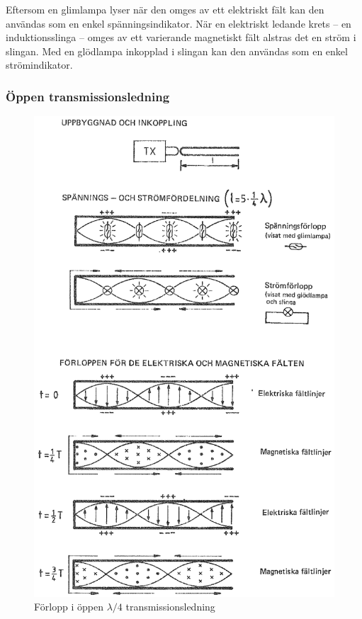 Eftersom en glimlampa lyser när den omges av ett elektriskt fält kan
den användas som en enkel spänningsindikator.  När en elektriskt
ledande krets -- en induktionsslinga -- omges av ett varierande
magnetiskt fält alstras det en ström i slingan.  Med en glödlampa
inkopplad i slingan kan den användas som en enkel strömindikator.

\subsubsection{Öppen transmissionsledning}

\begin{figure}
  \includegraphics[width=\textwidth]{images/cropped_pdfs/bild_2_6-33.pdf}
  \caption{Förlopp i öppen $\lambda/4$ transmissionsledning}
  \label{fig:bildII6-33}
\end{figure}

